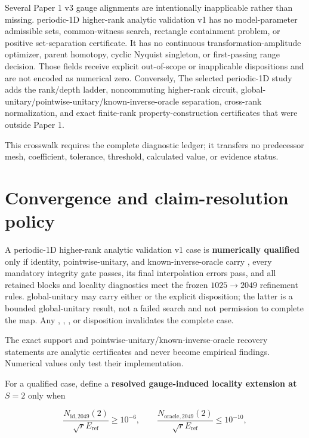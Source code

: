 \documentclass[11pt]{article}
\begin{document}
Several Paper 1 v3 gauge alignments are intentionally inapplicable rather than missing. periodic-1D higher-rank analytic validation v1
has no model-parameter admissible sets, common-witness search, rectangle containment
problem, or positive set-separation certificate. It has no continuous transformation-amplitude
optimizer, parent homotopy, cyclic Nyquist singleton, or first-passing range decision.
Those fields receive explicit out-of-scope or inapplicable dispositions and are not
encoded as numerical zero. Conversely, The selected periodic-1D study adds the rank/depth ladder, noncommuting
higher-rank circuit, global-unitary/pointwise-unitary/known-inverse-oracle separation, cross-rank normalization, and exact finite-rank
property-construction certificates that were outside Paper 1.

This crosswalk requires the complete diagnostic ledger; it transfers no predecessor
mesh, coefficient, tolerance, threshold, calculated value, or evidence status.

\section{Convergence and claim-resolution policy}

A periodic-1D higher-rank analytic validation v1 case is \textbf{numerically qualified} only if identity, pointwise-unitary, and known-inverse-oracle carry
, every mandatory integrity gate passes, its final interpolation errors
pass, and all retained blocks and locality diagnostics meet the frozen
$1025\rightarrow2049$ refinement rules. global-unitary may carry either  or the
explicit  disposition; the latter is a bounded global-unitary result,
not a failed search and not permission to complete the map. Any
, ,
, or  disposition
invalidates the complete case.

The exact support and pointwise-unitary/known-inverse-oracle recovery statements are analytic certificates and never
become empirical findings. Numerical values only test their implementation.

For a qualified case, define a \textbf{resolved gauge-induced locality extension at $S=2$}
only when

\[
\frac{N_{\mathrm{id},2049}(2)}{\sqrt rE_{\mathrm{ref}}}\geq10^{-6},
\qquad
\frac{N_{\mathrm{oracle},2049}(2)}{\sqrt rE_{\mathrm{ref}}}\leq10^{-10},
\]
\end{document}
